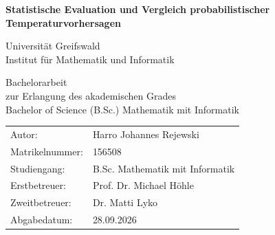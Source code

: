 \begin{titlepage}
    \vspace*{4cm}
    \centering

    {\huge\bfseries Statistische Evaluation und Vergleich probabilistischer Temperaturvorhersagen\par}
    \vspace{2cm}

     {\LARGE Universität Greifswald\\
    Institut für Mathematik und Informatik\par}

     \vspace{1.5cm}
     
{\large
Bachelorarbeit\\
zur Erlangung des akademischen Grades\\
Bachelor of Science (B.Sc.) Mathematik mit Informatik
}

   

\vfill
\raggedright

{\large
    \begin{tabular}{ll}
        Autor: & Harro Johannes Rejewski\\
        Matrikelnummer: & 156508\\
        Studiengang: & B.Sc. Mathematik mit Informatik\\
        Erstbetreuer: & Prof. Dr. Michael Höhle \\
        Zweitbetreuer: & Dr. Matti Lyko\\
        Abgabedatum: & 28.09.2026 \\
    \end{tabular}
    }

    \vspace{5cm}


\end{titlepage}